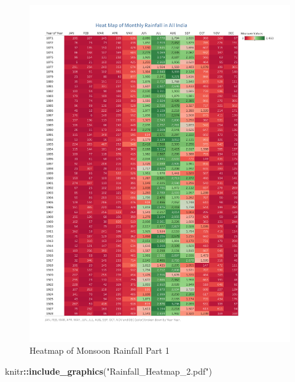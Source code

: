 \documentclass[12pt,openany]{book}
\newenvironment{Shaded}{\begin{snugshade}}{\end{snugshade}}
\newcommand{\KeywordTok}[1]{\textcolor[rgb]{0.13,0.29,0.53}{\textbf{#1}}}
\newcommand{\NormalTok}[1]{#1}
\newcommand{\OperatorTok}[1]{\textcolor[rgb]{0.81,0.36,0.00}{\textbf{#1}}}
\newcommand{\StringTok}[1]{\textcolor[rgb]{0.31,0.60,0.02}{#1}}
\begin{document}
\begin{figure}
\centering
\includegraphics{Rainfall_Heatmap_1.pdf}
\caption{\label{fig:unnamed-chunk-12}Heatmap of Monsoon Rainfall Part 1}
\end{figure}

\begin{Shaded}
\begin{Highlighting}[]
\NormalTok{knitr}\OperatorTok{::}\KeywordTok{include_graphics}\NormalTok{(}\StringTok{"Rainfall_Heatmap_2.pdf"}\NormalTok{)}
\end{Highlighting}
\end{Shaded}
\end{document}
